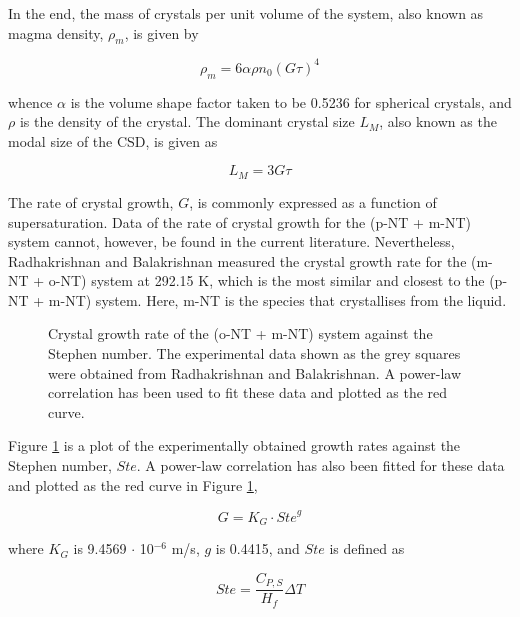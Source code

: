 In the end, the mass of crystals per unit volume of the system, also known as magma density, $\rho_m$, is given by

\begin{equation} \label{eq:magma density}
    \rho_m = 6 \alpha \rho n_0 (G \tau)^4
\end{equation}

\noindent whence $\alpha$ is the volume shape factor taken to be 0.5236 for spherical crystals, and $\rho$ is the density of the crystal. The dominant crystal size $L_M$, also known as the modal size of the CSD, is given as 

\begin{equation}
    L_M = 3 G \tau
\end{equation}

The rate of crystal growth, $G$, is commonly expressed as a function of supersaturation. Data of the rate of crystal growth for the (p-NT + m-NT) system cannot, however, be found in the current literature. Nevertheless, Radhakrishnan and Balakrishnan measured the crystal growth rate for the (m-NT + o-NT) system at 292.15 K, which is the most similar and closest to the (p-NT + m-NT) system. \cite{Radhakrishnan} Here, m-NT is the species that crystallises from the liquid.

\begin{figure}[h]
    \centering
    
    \caption{Crystal growth rate of the (o-NT + m-NT) system against the Stephen number. The experimental data shown as the grey squares were obtained from Radhakrishnan and Balakrishnan. \cite{Radhakrishnan} A power-law correlation has been used to fit these data and plotted as the red curve.}
    \label{fig:o-NT + m-NT kinetics}
\end{figure}

Figure \ref{fig:o-NT + m-NT kinetics} is a plot of the experimentally obtained growth rates against the Stephen number, $Ste$. A power-law correlation has also been fitted for these data and plotted as the red curve in Figure \ref{fig:o-NT + m-NT kinetics},

\begin{equation}
    G = K_G \cdot {Ste}^{g}
\end{equation}

\noindent where $K_G$ is 9.4569 $\cdot$ 10$^{-6}$ m/s, $g$ is 0.4415, and $Ste$ is defined as 

\begin{equation}
    Ste = \frac{C_{P,S}}{H_{f}} \Delta T
\end{equation}

